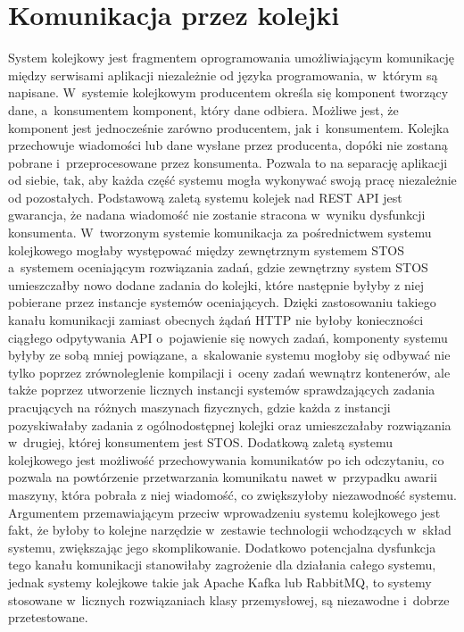 \section{Komunikacja przez kolejki}
System kolejkowy jest fragmentem oprogramowania umożliwiającym komunikację między serwisami aplikacji niezależnie od języka programowania, w~którym są napisane. W~systemie kolejkowym producentem określa się komponent tworzący dane, a~konsumentem komponent, który dane odbiera. Możliwe jest, że komponent jest jednocześnie zarówno producentem, jak i~konsumentem. Kolejka przechowuje wiadomości lub dane wysłane przez producenta, dopóki nie zostaną pobrane i~przeprocesowane przez konsumenta. Pozwala to na separację aplikacji od siebie, tak, aby każda część systemu mogła wykonywać swoją pracę niezależnie od pozostałych. Podstawową zaletą systemu kolejek nad REST API jest gwarancja, że nadana wiadomość nie zostanie stracona w~wyniku dysfunkcji konsumenta. W~tworzonym systemie komunikacja za pośrednictwem systemu kolejkowego mogłaby występować między zewnętrznym systemem STOS a~systemem oceniającym rozwiązania zadań, gdzie zewnętrzny system STOS umieszczałby nowo dodane zadania do kolejki, które następnie byłyby z niej pobierane przez instancje systemów oceniających. Dzięki zastosowaniu takiego kanału komunikacji zamiast obecnych żądań HTTP nie byłoby konieczności ciągłego odpytywania API o~pojawienie się nowych zadań, komponenty systemu byłyby ze sobą mniej powiązane, a~skalowanie systemu mogłoby się odbywać nie tylko poprzez zrównoleglenie kompilacji i~oceny zadań wewnątrz kontenerów, ale także poprzez utworzenie licznych instancji systemów sprawdzających zadania pracujących na różnych maszynach fizycznych, gdzie każda z instancji pozyskiwałaby zadania z ogólnodostępnej kolejki oraz umieszczałaby rozwiązania w~drugiej, której konsumentem jest STOS. Dodatkową zaletą systemu kolejkowego jest możliwość przechowywania komunikatów po ich odczytaniu, co pozwala na powtórzenie przetwarzania komunikatu nawet w~przypadku awarii maszyny, która pobrała z niej wiadomość, co zwiększyłoby niezawodność systemu. Argumentem przemawiającym przeciw wprowadzeniu systemu kolejkowego jest fakt, że byłoby to kolejne narzędzie w~zestawie technologii wchodzących w~skład systemu, zwiększając jego skomplikowanie. Dodatkowo potencjalna dysfunkcja tego kanału komunikacji stanowiłaby zagrożenie dla działania całego systemu, jednak systemy kolejkowe takie jak Apache Kafka lub RabbitMQ, to systemy stosowane w~licznych rozwiązaniach klasy przemysłowej, są niezawodne i~dobrze przetestowane.
